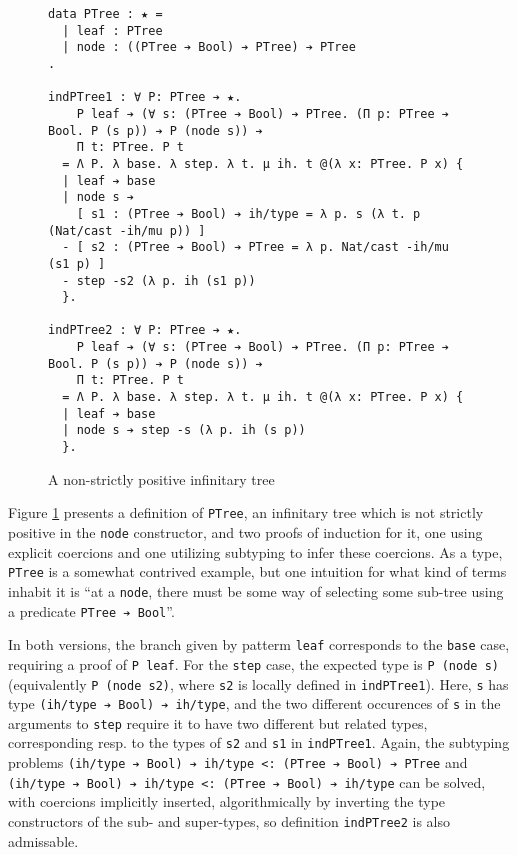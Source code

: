 \documentclass{article}
\begin{document}
\begin{figure}[h]
\begin{verbatim}
data PTree : ★ =
  | leaf : PTree
  | node : ((PTree ➔ Bool) ➔ PTree) ➔ PTree
.

indPTree1 : ∀ P: PTree ➔ ★.
    P leaf ➔ (∀ s: (PTree ➔ Bool) ➔ PTree. (Π p: PTree ➔ Bool. P (s p)) ➔ P (node s)) ➔
    Π t: PTree. P t
  = Λ P. λ base. λ step. λ t. μ ih. t @(λ x: PTree. P x) {
  | leaf ➔ base
  | node s ➔
    [ s1 : (PTree ➔ Bool) ➔ ih/type = λ p. s (λ t. p (Nat/cast -ih/mu p)) ]
  - [ s2 : (PTree ➔ Bool) ➔ PTree = λ p. Nat/cast -ih/mu (s1 p) ]
  - step -s2 (λ p. ih (s1 p))
  }.

indPTree2 : ∀ P: PTree ➔ ★.
    P leaf ➔ (∀ s: (PTree ➔ Bool) ➔ PTree. (Π p: PTree ➔ Bool. P (s p)) ➔ P (node s)) ➔
    Π t: PTree. P t
  = Λ P. λ base. λ step. λ t. μ ih. t @(λ x: PTree. P x) {
  | leaf ➔ base
  | node s ➔ step -s (λ p. ih (s p))
  }.
\end{verbatim}
  \caption{A non-strictly positive infinitary tree}
  \label{fig:ptree}
\end{figure}

Figure \ref{fig:ptree} presents a definition of \texttt{PTree}, an infinitary
tree which is not strictly positive in the \texttt{node} constructor, and two
proofs of induction for it, one using explicit coercions and one utilizing
subtyping to infer these coercions. As a type, \texttt{PTree} is a somewhat
contrived example, but one intuition for what kind of terms inhabit it is ``at a
\texttt{node}, there must be some way of selecting some sub-tree using a
predicate \texttt{PTree ➔ Bool}''.

In both versions, the branch given by patterm \texttt{leaf} corresponds to the
\texttt{base} case, requiring a proof of \texttt{P leaf}. For the \texttt{step}
case, the expected type is \texttt{P (node s)} (equivalently \texttt{P (node
  s2)}, where \texttt{s2} is locally defined in \texttt{indPTree1}). Here,
\texttt{s} has type \texttt{(ih/type ➔ Bool) ➔ ih/type}, and the two different
occurences of \texttt{s} in the arguments to \texttt{step} require it to have
two different but related types, corresponding resp. to the types of \texttt{s2}
and \texttt{s1} in \texttt{indPTree1}. Again, the subtyping problems
\texttt{(ih/type ➔ Bool) ➔ ih/type <: (PTree ➔ Bool) ➔ PTree} and
\texttt{(ih/type ➔ Bool) ➔ ih/type <: (PTree ➔ Bool) ➔ ih/type} can be
solved, with coercions implicitly inserted, algorithmically by
inverting the type constructors of the sub- and super-types, so definition
\texttt{indPTree2} is also admissable.
\end{document}
